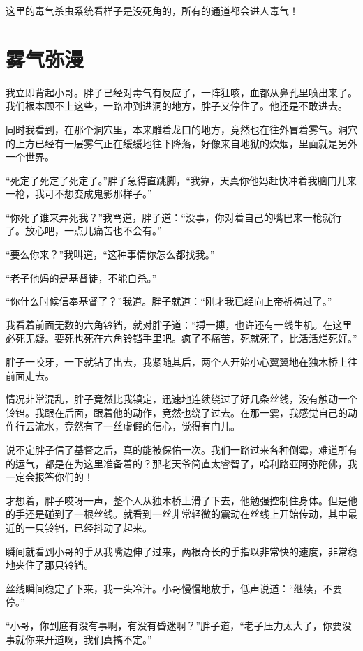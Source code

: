 这里的毒气杀虫系统看样子是没死角的，所有的通道都会进人毒气！

\chapter{雾气弥漫}

我立即背起小哥。胖子已经对毒气有反应了，一阵狂咳，血都从鼻孔里喷出来了。我们根本顾不上这些，一路冲到进洞的地方，胖子又停住了。他还是不敢进去。

同时我看到，在那个洞穴里，本来雕着龙口的地方，竞然也在往外冒着雾气。洞穴的上方已经有一层雾气正在缓缓地往下降落，好像来自地狱的炊烟，里面就是另外一个世界。

“死定了死定了死定了。”胖子急得直跳脚，“我靠，天真你他妈赶快冲着我脑门儿来一枪，我可不想变成鬼影那样子。”

“你死了谁来弄死我？”我骂道，胖子道：“没事，你对着自己的嘴巴来一枪就行了。放心吧，一点儿痛苦也不会有。”

“要么你来？”我叫道，“这种事情你怎么都找我。”

“老子他妈的是基督徒，不能自杀。”

“你什么时候信奉基督了？”我道。胖子就道：“刚才我已经向上帝祈祷过了。”

我看着前面无数的六角钤铛，就对胖子道：“搏一搏，也许还有一线生机。在这里必死无疑。要死也死在六角铃铛手里吧。疯了不痛苦，死就死了，比活活烂死好。”

胖子一咬牙，一下就钻了出去，我紧随其后，两个人开始小心翼翼地在独木桥上往前面走去。

情况非常混乱，胖子竟然比我镇定，迅速地连续绕过了好几条丝线，没有触动一个铃铛。我跟在后面，跟着他的动作，竞然也绕了过去。在那一霎，我感觉自己的动作行云流水，竞然有了一丝虚假的信心，觉得有门儿。

说不定胖子信了基督之后，真的能被保佑一次。我们一路过来各种倒霉，难道所有的运气，都是在为这里准备着的？那老天爷简直太睿智了，哈利路亚阿弥陀佛，我一定会报答你们的！

才想着，胖子哎呀一声，整个人从独木桥上滑了下去，他勉强控制住身体。但是他的手还是碰到了一根丝线。就看到一丝非常轻微的震动在丝线上开始传动，其中最近的一只铃铛，已经抖动了起来。

瞬间就看到小哥的手从我嘴边伸了过来，两根奇长的手指以非常快的速度，非常稳地夹住了那只铃铛。

丝线瞬间稳定了下来，我一头冷汗。小哥慢慢地放手，低声说道：“继续，不要停。”

“小哥，你到底有没有事啊，有没有昏迷啊？”胖子道，“老子压力太大了，你要没事就你来开道啊，我们真搞不定。”

